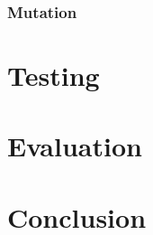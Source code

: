 \documentclass[a4paper, 12pt]{report}
\begin{document}
\subsection{Mutation}

\chapter{Testing}

\chapter{Evaluation}

\chapter{Conclusion}

\renewcommand\bibname{References}


%
\end{document}
